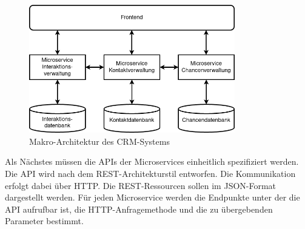 \begin{figure}[H] 
    \centering
    \includegraphics[width=0.8\textwidth]{figures/CRMEntwurf.png}
    \caption{Makro-Architektur des \ac{CRM}-Systems}
    \label{fig:CRMENTWURF}
\end{figure}

Als Nächstes müssen die \acp{API} der Microservices einheitlich spezifiziert werden. Die \ac{API} wird nach dem \ac{REST}-Architekturstil entworfen. Die Kommunikation erfolgt dabei über \ac{HTTP}. Die \ac{REST}-Ressourcen sollen im \ac{JSON}-Format dargestellt werden. Für jeden Microservice werden die Endpunkte unter der die API aufrufbar ist, die HTTP-Anfragemethode und die zu übergebenden Parameter bestimmt.

